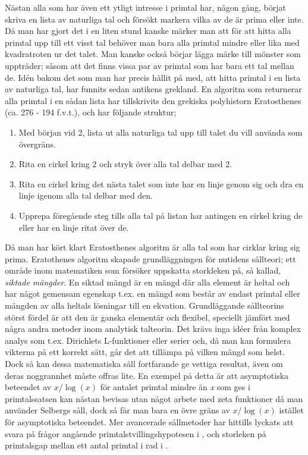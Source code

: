 Nästan alla som har även ett ytligt intresse i primtal har, någon gång, börjat skriva en lista av naturliga tal och försökt markera vilka av de är prima eller inte. Då man har gjort det i en liten stund kanske märker man att för att hitta alla primtal upp till ett visst tal behöver man bara alla primtal mindre eller lika med kvadratroten ur det talet. Man kanske också börjar lägga märke till mönster som uppträder; såsom att det finns vissa par av primtal som har bara ett tal mellan de. Idén bakom det som man har precis hållit på med, att hitta primtal i en lista av naturliga tal, har funnits sedan antikens grekland. En algoritm som returnerar alla primtal i en sådan lista har tillskrivits den grekiska polyhistorn Eratosthenes (ca. 276 - 194 f.v.t.), och har följande struktur;
\begin{enumerate}
    \item Med början vid 2, lista ut alla naturliga tal upp till talet du vill använda som övergräns.
    \item Rita en cirkel kring 2 och stryk över alla tal delbar med 2.
    \item Rita en cirkel kring det nästa talet som inte har en linje genom sig och dra en linje igenom alla tal delbar med den.
    \item Upprepa föregående steg tills alla tal på listan har antingen en cirkel kring de eller har en linje ritat över de. 
\end{enumerate}
Då man har kört klart Eratosthenes algoritm är alla tal som har cirklar kring sig prima. Eratothenes algoritm skapade grundläggningen för nutidens sållteori; ett område inom matematiken som försöker uppskatta storkleken på, så kallad, \textit{siktade mängder}. En siktad mängd är en mängd där alla element är heltal och har något gemensam egenskap t.ex. en mängd som består av endast primtal eller mängden av alla heltals lösningar till en ekvation. Grundläggande sållteorins störst fördel är att den är ganska elementär och flexibel, speciellt jämfört med några andra metoder inom analytisk talteorin. Det krävs inga idéer från komplex analys som t.ex. Dirichlets L-funktioner eller serier och, då man kan formulera vikterna på ett korrekt sätt, går det att tillämpa på vilken mängd som helst. Dock så kan dessa matematiska såll fortfarande ge vettiga resultat, även om deras noggrannhet måste offras lite. En exempel på detta är att asymptotiska beteendet av \(x/\log(x)\) för antalet primtal mindre än \textit{x} som ges i primtalssatsen kan nästan bevisas utan något arbete med zeta funktioner då man använder Selbergs såll, dock så får man bara en övre gräns av \(x/\log(x)\) istället för asymptotiska beteendet. Mer avancerade sållmetoder har hittills lyckats att svara på frågor angående primtalstvillingshypotesen i \cite{chen2Prime}, och storleken på primtalsgap mellan ett antal primtal i rad i \cite{mayBound}.

